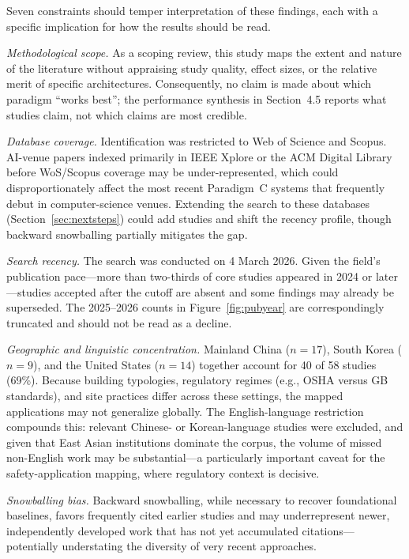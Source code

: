 \documentclass[10pt,letterpaper]{article}
\begin{document}
Seven constraints should temper interpretation of these findings, each with a specific implication for how the results should be read.

\textit{Methodological scope.} As a scoping review, this study maps the extent and nature of the literature without appraising study quality, effect sizes, or the relative merit of specific architectures. Consequently, no claim is made about which paradigm ``works best''; the performance synthesis in Section~4.5 reports what studies claim, not which claims are most credible.

\textit{Database coverage.} Identification was restricted to Web of Science and Scopus. AI-venue papers indexed primarily in IEEE Xplore or the ACM Digital Library before WoS/Scopus coverage may be under-represented, which could disproportionately affect the most recent Paradigm~C systems that frequently debut in computer-science venues. Extending the search to these databases (Section~\ref{sec:nextsteps}) could add studies and shift the recency profile, though backward snowballing partially mitigates the gap.

\textit{Search recency.} The search was conducted on 4 March 2026. Given the field's publication pace---more than two-thirds of core studies appeared in 2024 or later---studies accepted after the cutoff are absent and some findings may already be superseded. The 2025--2026 counts in Figure~\ref{fig:pubyear} are correspondingly truncated and should not be read as a decline.

\textit{Geographic and linguistic concentration.} Mainland China ($n=17$), South Korea ($n=9$), and the United States ($n=14$) together account for 40 of 58 studies (69\%). Because building typologies, regulatory regimes (e.g., OSHA versus GB standards), and site practices differ across these settings, the mapped applications may not generalize globally. The English-language restriction compounds this: relevant Chinese- or Korean-language studies were excluded, and given that East Asian institutions dominate the corpus, the volume of missed non-English work may be substantial---a particularly important caveat for the safety-application mapping, where regulatory context is decisive.

\textit{Snowballing bias.} Backward snowballing, while necessary to recover foundational baselines, favors frequently cited earlier studies and may underrepresent newer, independently developed work that has not yet accumulated citations---potentially understating the diversity of very recent approaches.
\end{document}
